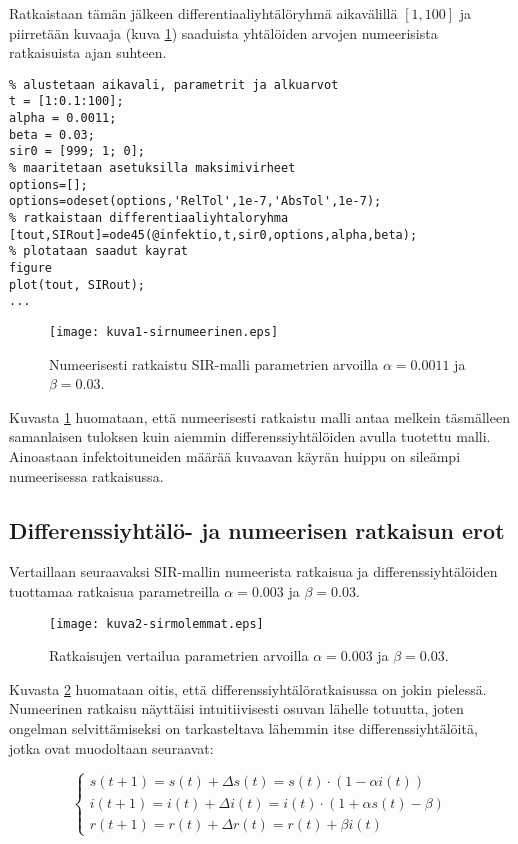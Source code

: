 \documentclass[a4paper,11pt]{article}
\begin{document}
Ratkaistaan tämän jälkeen differentiaaliyhtälöryhmä aikavälillä $[1, 100]$ ja piirretään kuvaaja (kuva \ref{fig:sir1}) saaduista yhtälöiden arvojen numeerisista ratkaisuista ajan suhteen.

\begin{lstlisting}
% alustetaan aikavali, parametrit ja alkuarvot
t = [1:0.1:100];
alpha = 0.0011;
beta = 0.03;
sir0 = [999; 1; 0];
% maaritetaan asetuksilla maksimivirheet
options=[];
options=odeset(options,'RelTol',1e-7,'AbsTol',1e-7);
% ratkaistaan differentiaaliyhtaloryhma
[tout,SIRout]=ode45(@infektio,t,sir0,options,alpha,beta);
% plotataan saadut kayrat
figure
plot(tout, SIRout);
...
\end{lstlisting}

\begin{figure}
    \centering
    \texttt{[image: kuva1-sirnumeerinen.eps]}
    \caption{Numeerisesti ratkaistu SIR-malli parametrien arvoilla $\alpha=0.0011$ ja $\beta=0.03$.}
    \label{fig:sir1}
\end{figure}

Kuvasta \ref{fig:sir1} huomataan, että numeerisesti ratkaistu malli antaa melkein täsmälleen samanlaisen tuloksen kuin aiemmin differenssiyhtälöiden avulla tuotettu malli. Ainoastaan infektoituneiden määrää kuvaavan käyrän huippu on sileämpi numeerisessa ratkaisussa.

\subsection{Differenssiyhtälö- ja numeerisen ratkaisun erot}

Vertaillaan seuraavaksi SIR-mallin numeerista ratkaisua ja differenssiyhtälöiden tuottamaa ratkaisua parametreilla $\alpha=0.003$ ja $\beta=0.03$.

\begin{figure}
    \centering
    \texttt{[image: kuva2-sirmolemmat.eps]}
    \caption{Ratkaisujen vertailua parametrien arvoilla $\alpha=0.003$ ja $\beta=0.03$.}
    \label{fig:sir2}
\end{figure}

Kuvasta \ref{fig:sir2} huomataan oitis, että differenssiyhtälöratkaisussa on jokin pielessä. Numeerinen ratkaisu näyttäisi intuitiivisesti osuvan lähelle totuutta, joten ongelman selvittämiseksi on tarkasteltava lähemmin itse differenssiyhtälöitä, jotka ovat muodoltaan seuraavat:

\begin{equation}
\label{diffyt}
    \begin{cases}
    s(t+1)=s(t)+\Delta s(t) = s(t)\cdot(1-\alpha i(t)) \\
    i(t+1)=i(t)+\Delta i(t) = i(t)\cdot(1+\alpha s(t) - \beta)\\
    r(t+1)=r(t)+\Delta r(t) = r(t) + \beta i(t)
    \end{cases}
\end{equation}
\end{document}
